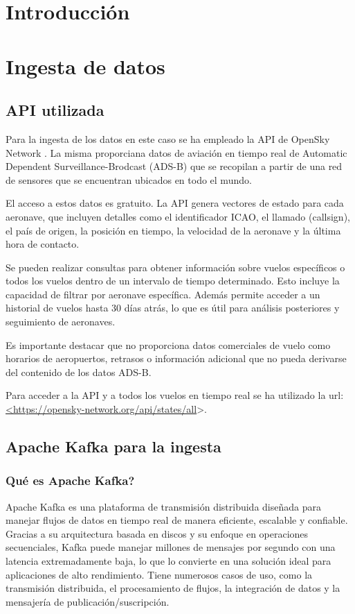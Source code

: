\documentclass{article}
\begin{document}
\section{Introducción}

\section{Ingesta de datos}

\subsection{API utilizada}

Para la ingesta de los datos en este caso se ha empleado la API de OpenSky Network \cite{Schaefer2014}. La misma proporciana datos de aviación en tiempo real de Automatic Dependent Surveillance-Brodcast (ADS-B) que se recopilan a
partir de una red de sensores que se encuentran ubicados en todo el mundo.

El acceso a estos datos es gratuito. La API genera vectores de estado para cada aeronave, que incluyen detalles como el identificador ICAO, el llamado (callsign), el país de origen, la posición en tiempo, la velocidad de la aeronave y la última hora de contacto.

Se pueden realizar consultas para obtener información sobre vuelos específicos o todos los vuelos dentro de un intervalo de tiempo determinado. Esto incluye la capacidad de filtrar por aeronave específica.
Además permite acceder a un historial de vuelos hasta 30 días atrás, lo que es útil para análisis posteriores y seguimiento de aeronaves.

Es importante destacar que no proporciona datos comerciales de vuelo como horarios de aeropuertos, retrasos o información adicional que no pueda derivarse del contenido de los datos ADS-B.

Para acceder a la API y a todos los vuelos en tiempo real se ha utilizado la url: \url{<https://opensky-network.org/api/states/all}>.

\subsection{Apache Kafka para la ingesta}
\subsubsection{Qué es Apache Kafka?}

Apache Kafka es una plataforma de transmisión distribuida diseñada para manejar flujos de datos en tiempo real de manera eficiente, escalable y confiable. Gracias a su arquitectura basada en discos y su enfoque en operaciones secuenciales, Kafka puede manejar millones de mensajes por segundo con una latencia extremadamente baja, lo que lo convierte en una solución ideal para aplicaciones de alto rendimiento.
Tiene numerosos casos de uso, como la transmisión distribuida, el procesamiento de flujos, la integración de datos y la mensajería de publicación/suscripción.
\end{document}
